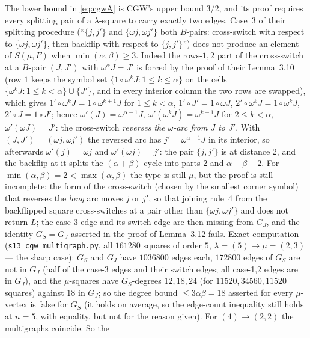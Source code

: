 \begin{remark}\label{rem:cgwgap}
The lower bound in \eqref{eq:cgwA} is CGW's upper bound $3/2$, and
its proof requires every splitting pair of a $\lambda$-square to
carry exactly two edges.  Case~3 of their splitting procedure
(``$\{j,j'\}$ and $\{\omega j,\omega j'\}$ both $B$-pairs:
cross-switch with respect to $\{\omega j,\omega j'\}$, then backflip
with respect to $\{j,j'\}$'') does not produce an element of
$S(\mu,F)$ when $\min(\alpha,\beta)\ge3$.  Indeed the rows-$1,2$ part of
the cross-switch at a $B$-pair $(J,J')$ with $\omega^\alpha J=J'$ is
forced by the proof of their Lemma~3.10 (row $1$ keeps the symbol set
$\{1\circ\omega^kJ:1\le k\le\alpha\}$ on the cells
$\{\omega^kJ:1\le k<\alpha\}\cup\{J'\}$, and in every interior column
the two rows are swapped), which gives $1'\circ\omega^kJ=1\circ\omega^{k+1}J$
for $1\le k<\alpha$, $1'\circ J'=1\circ\omega J$, $2'\circ\omega^kJ=1\circ\omega^kJ$,
$2'\circ J=1\circ J'$; hence $\omega'(J)=\omega^{\alpha-1}J$,
$\omega'(\omega^kJ)=\omega^{k-1}J$ for $2\le k<\alpha$, $\omega'(\omega J)=J'$:
the cross-switch \emph{reverses the $\omega$-arc from $J$ to $J'$}.
With $(J,J')=(\omega j,\omega j')$ the reversed arc has $j'=\omega^{\alpha-1}J$
in its interior, so afterwards $\omega'(j)=\omega j$ and
$\omega'(\omega j)=j'$: the pair $\{j,j'\}$ is at distance $2$, and the
backflip at it splits the $(\alpha+\beta)$-cycle into parts $2$ and
$\alpha+\beta-2$.  For $\min(\alpha,\beta)=2<\max(\alpha,\beta)$ the
type is still $\mu$, but the proof is still incomplete: the form of
the cross-switch (chosen by the smallest corner symbol) that reverses
the \emph{long} arc moves $j$ or $j'$, so that joining rule~4 from the
backflipped square cross-switches at a pair other than
$\{\omega j,\omega j'\}$ and does not return $L$; the case-3 edge and
its switch edge are then missing from $G_J$, and the identity
$G_S=G_J$ asserted in the proof of Lemma~3.12 fails.  Exact
computation (\texttt{s13\_cgw\_multigraph.py}, all $161280$ squares of
order $5$, $\lambda=(5)\to\mu=(2,3)$ --- the sharp case): $G_S$ and
$G_J$ have $1036800$ edges each, $172800$ edges of $G_S$ are not in
$G_J$ (half of the case-3 edges and their switch edges; all case-1,2
edges are in $G_J$), and the $\mu$-squares have $G_S$-degrees
$12,18,24$ (for $11520,34560,11520$ squares) against $18$ in $G_J$; so
the degree bound $\le3\alpha\beta=18$ asserted for every $\mu$-vertex
is false for $G_S$ (it holds on average, so the edge-count inequality
still holds at $n=5$, with equality, but not for the reason given).  For $(4)\to(2,2)$ the multigraphs coincide.  So the

\end{remark}
